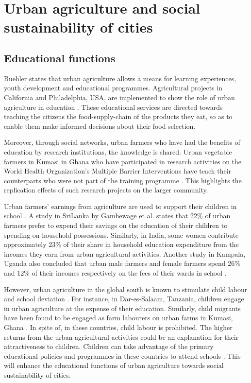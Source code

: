 \section{Urban agriculture and social sustainability of cities}
\label{sec:socialDim}

\subsection{Educational functions}

Buehler \cite{Buehler2016} states that urban agriculture allows a means for learning experiences, youth development and educational programmes. Agricultural projects in California and Philadelphia, USA, are implemented to show the role of urban agriculture in education \cite{Bradley2014}. These educational services are directed towards teaching the citizens the food-supply-chain of the products they eat, so as to enable them make informed decisions about their food selection.

Moreover, through social networks, urban farmers who have had the benefits of education by research institutions, the knowledge is shared. Urban vegetable farmers in Kumasi in Ghana who have participated in research activities on the World Health Organization's Multiple Barrier Interventions have teach their counterparts who were not part of the training programme \cite{Amponsah2015, Amponsah2016}. This highlights the replication effects of such research projects on the larger community.

Urban farmers' earnings from agriculture are used to support their children in school \cite{Prain2010}. A study in SriLanka by Gamhewage et al. \cite{Gamhewage2015} states that 22\% of urban farmers prefer to expend their savings on the education of their children to spending on household possessions. Similarly, in India, some women contribute approximately 23\% of their share in household education expenditure from the incomes they earn from urban agricultural activities. Another study in Kampala, Uganda also concluded that urban male farmers and female farmers spend 26\% and 12\% of their incomes respectively on the fees of their wards in school \cite{Buechler2005}.

However, urban agriculture in the global south is known to stimulate child labour and school deviation \cite{Edet2013, InternationalLabourOrganization2006}. For instance, in Dar-es-Salaam, Tanzania, children engage in urban agriculture at the expense of their education. Similarly, child migrants have been found to be engaged as farm labourers on urban farms in Kumasi, Ghana \cite{Amponsah2016a}. In spite of, in these countries, child labour is prohibited. The higher returns from the urban agricultural activities could be an explanation for their attractiveness to children. Children can take advantage of the primary educational policies and programmes in these countries to attend schools \cite{Nishimura2013}. This will enhance the educational functions of urban agriculture towards social sustainability of cities.

